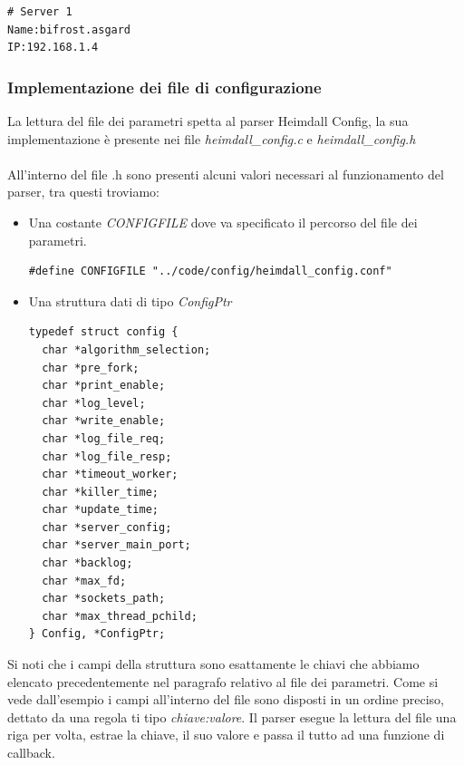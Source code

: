 \documentclass[italian]{tktltiki2}
\begin{document}
\begin{lstlisting}
# Server 1
Name:bifrost.asgard
IP:192.168.1.4
\end{lstlisting}

\subsubsection{Implementazione dei file di configurazione}
\label{ssec:file_config_impl}

La lettura del file dei parametri spetta al parser Heimdall Config, la sua implementazione è presente nei file \emph{heimdall\_config.c} e \emph{heimdall\_config.h} \\\\ All'interno del file .h sono presenti alcuni valori necessari al funzionamento del parser, tra questi troviamo:
\begin{itemize}

\item Una costante \emph{CONFIGFILE} dove va specificato il percorso del file dei parametri.
  
\begin{lstlisting}
#define CONFIGFILE "../code/config/heimdall_config.conf"
\end{lstlisting}
  
\item Una struttura dati di tipo \emph{ConfigPtr}

\begin{lstlisting}
typedef struct config {
  char *algorithm_selection;
  char *pre_fork;
  char *print_enable;
  char *log_level;
  char *write_enable;
  char *log_file_req;
  char *log_file_resp;
  char *timeout_worker;
  char *killer_time;
  char *update_time;
  char *server_config;
  char *server_main_port;
  char *backlog;
  char *max_fd;
  char *sockets_path;
  char *max_thread_pchild;
} Config, *ConfigPtr;  
\end{lstlisting}


\end{itemize}
Si noti che i campi della struttura sono esattamente le chiavi che abbiamo elencato precedentemente nel paragrafo relativo al file dei parametri. Come si vede dall'esempio i campi all'interno del file sono disposti in un ordine preciso, dettato da una regola ti tipo \emph{chiave:valore}. Il parser esegue la lettura del file una riga per volta, estrae la chiave, il suo valore e passa il tutto ad una funzione di callback.
\end{document}
